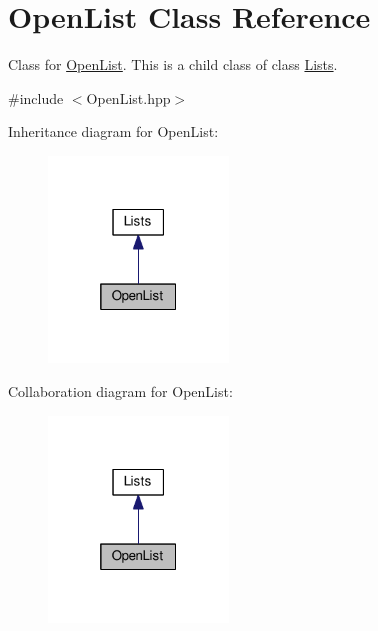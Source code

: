 \hypertarget{classOpenList}{}\section{Open\+List Class Reference}
\label{classOpenList}


Class for \hyperlink{classOpenList}{Open\+List}. This is a child class of class \hyperlink{classLists}{Lists}.  




{\ttfamily \#include $<$Open\+List.\+hpp$>$}



Inheritance diagram for Open\+List\+:
\nopagebreak
\begin{figure}[H]
\begin{center}
\leavevmode
\includegraphics[width=136pt]{classOpenList__inherit__graph}
\end{center}
\end{figure}


Collaboration diagram for Open\+List\+:
\nopagebreak
\begin{figure}[H]
\begin{center}
\leavevmode
\includegraphics[width=136pt]{classOpenList__coll__graph}
\end{center}
\end{figure}
